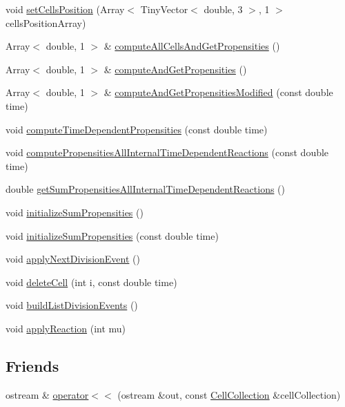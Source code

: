 \begin{DoxyCompactItemize}
\item 
void \hyperlink{class_cell_collection_a42e03aa4ee920fb9fb0278ff9429f883}{set\-Cells\-Position} (\-Array$<$ \-Tiny\-Vector$<$ double, 3 $>$, 1 $>$ cells\-Position\-Array)
\item 
\-Array$<$ double, 1 $>$ \& \hyperlink{class_cell_collection_a4b73332003358f0f06a0def79002417b}{compute\-All\-Cells\-And\-Get\-Propensities} ()
\item 
\-Array$<$ double, 1 $>$ \& \hyperlink{class_cell_collection_a4882ea6a3f20a950723b21ec9e152b33}{compute\-And\-Get\-Propensities} ()
\item 
\-Array$<$ double, 1 $>$ \& \hyperlink{class_cell_collection_aeb934fdf5a82b1c4406fc93da6a09c04}{compute\-And\-Get\-Propensities\-Modified} (const double time)
\item 
void \hyperlink{class_cell_collection_a5ba177ec9cdbd54e973f518ec5aa1c15}{compute\-Time\-Dependent\-Propensities} (const double time)
\item 
void \hyperlink{class_cell_collection_afd23a12746264399da0d7b92636fbcec}{compute\-Propensities\-All\-Internal\-Time\-Dependent\-Reactions} (const double time)
\item 
double \hyperlink{class_cell_collection_a33f98ed9d986282595770bd99f3dca98}{get\-Sum\-Propensities\-All\-Internal\-Time\-Dependent\-Reactions} ()
\item 
void \hyperlink{class_cell_collection_a4776a24572a3deadac395807a04ae358}{initialize\-Sum\-Propensities} ()
\item 
void \hyperlink{class_cell_collection_aaaa508931fe5f373554336817f47c0f1}{initialize\-Sum\-Propensities} (const double time)
\item 
void \hyperlink{class_cell_collection_abbe2af90b96ba11f1610c1563a006a29}{apply\-Next\-Division\-Event} ()
\item 
void \hyperlink{class_cell_collection_af419ee956df66b05cf1ef979a3de9667}{delete\-Cell} (int i, const double time)
\item 
void \hyperlink{class_cell_collection_a6305f9a2d18d0dd277693b7154794b0d}{build\-List\-Division\-Events} ()
\item 
void \hyperlink{class_cell_collection_a14a8c92a2646731e6384d4f7ddcb49a9}{apply\-Reaction} (int mu)
\end{DoxyCompactItemize}
\subsection*{\-Friends}
\begin{DoxyCompactItemize}
\item 
ostream \& \hyperlink{class_cell_collection_ab0a78cc0f31cec81458f40ab27bc7beb}{operator$<$$<$} (ostream \&out, const \hyperlink{class_cell_collection}{\-Cell\-Collection} \&cell\-Collection)
\end{DoxyCompactItemize}


